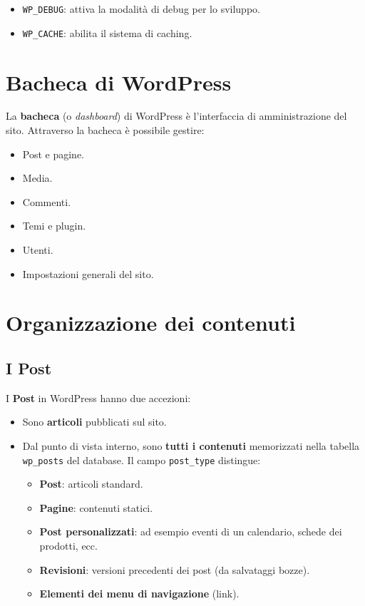 \begin{itemize}
    \item \texttt{WP\_DEBUG}: attiva la modalità di debug per lo sviluppo.
    \item \texttt{WP\_CACHE}: abilita il sistema di caching.
\end{itemize}

\section{Bacheca di WordPress}

La \textbf{bacheca} (o \emph{dashboard}) di WordPress è l'interfaccia di amministrazione del sito. Attraverso la bacheca è possibile gestire:

\begin{itemize}
    \item Post e pagine.
    \item Media.
    \item Commenti.
    \item Temi e plugin.
    \item Utenti.
    \item Impostazioni generali del sito.
\end{itemize}

\section{Organizzazione dei contenuti}

\subsection{I Post}

I \textbf{Post} in WordPress hanno due accezioni:

\begin{itemize}
    \item Sono \textbf{articoli} pubblicati sul sito.
    \item Dal punto di vista interno, sono \textbf{tutti i contenuti} memorizzati nella tabella \texttt{wp\_posts} del database. Il campo \texttt{post\_type} distingue:
    \begin{itemize}
        \item \textbf{Post}: articoli standard.
        \item \textbf{Pagine}: contenuti statici.
        \item \textbf{Post personalizzati}: ad esempio eventi di un calendario, schede dei prodotti, ecc.
        \item \textbf{Revisioni}: versioni precedenti dei post (da salvataggi bozze).
        \item \textbf{Elementi dei menu di navigazione} (link).
    \end{itemize}
\end{itemize}

